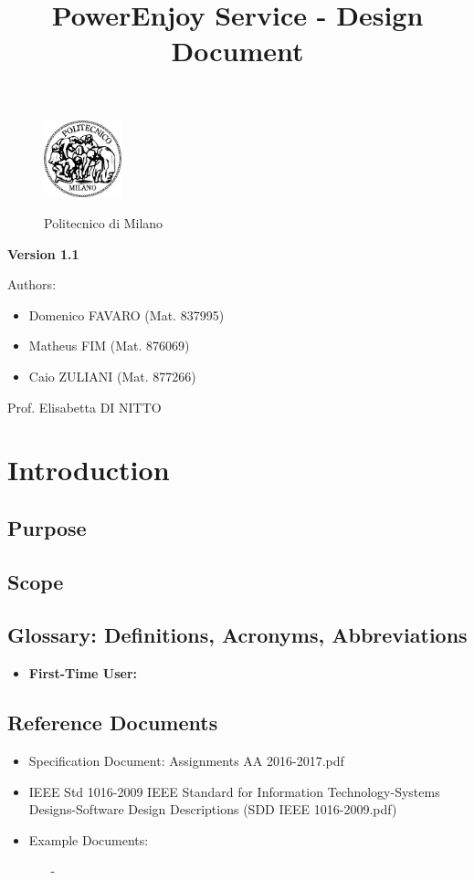 \documentclass[a4paper]{article}
\title{PowerEnjoy Service - Design Document}
\begin{document}
\begin{titlepage}
\begin{figure}
\centering
\includegraphics[width=0.2\textwidth]{polimi.jpg}
\par
\LARGE Politecnico di Milano
\end{figure}


\maketitle
\textbf{Version 1.1}
\newline

\raggedright
Authors:
\begin{itemize}
	\item Domenico FAVARO (Mat. 837995)
        	\item Matheus FIM (Mat. 876069)
	\item Caio ZULIANI (Mat. 877266)	
\end{itemize}
\raggedleft
Prof. Elisabetta DI NITTO
\thispagestyle{empty}
\end{titlepage}

\tableofcontents
\newpage
 
\section{Introduction}
\subsection{Purpose}
\subsection{Scope}
\subsection{Glossary: Definitions, Acronyms, Abbreviations}
\begin{itemize}
\item \textbf{First-Time User:}
\end{itemize}

\subsection{Reference Documents}
\begin{itemize}
\item Specification Document: Assignments AA 2016-2017.pdf
\item IEEE Std 1016-2009 IEEE Standard for Information Technology-Systems Designs-Software Design Descriptions (SDD IEEE 1016-2009.pdf)
\item Example Documents:
\begin{itemize}
\item[-] 
\end{itemize}
\end{itemize}
\end{document}
